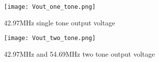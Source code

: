 \begin{appendices}
\begin{figure}[h] 
\texttt{[image: Vout\_one\_tone.png]}
\caption{42.97MHz single tone output voltage}
\label{fig:Vout_one_tone}
\end{figure}

\begin{figure}[h] 
\texttt{[image: Vout\_two\_tone.png]}
\caption{42.97MHz and 54.69MHz two tone output voltage}
\label{fig:Vout_two_tone}
\end{figure}
\end{appendices}